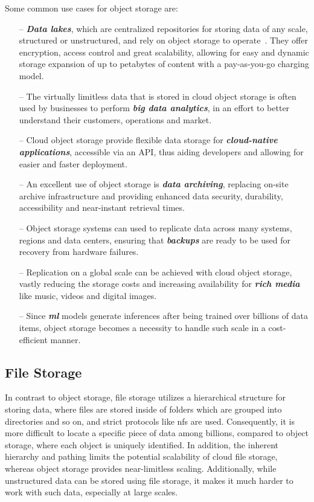 Some common use cases for object storage are:
\begin{itemize}
    \item[--] \textit{\textbf{Data lakes}}, which are centralized repositories for storing data of any scale, structured or unstructured, and rely on object storage to operate~\cite{datalake}. They offer encryption, access control and great scalability, allowing for easy and dynamic storage expansion of up to petabytes of content with a pay-as-you-go charging model.

    \item[--] The virtually limitless data that is stored in cloud object storage is often used by businesses to perform \textit{\textbf{big data analytics}}, in an effort to better understand their customers, operations and market.

    \item [--] Cloud object storage provide flexible data storage for \textit{\textbf{cloud-native applications}}, accessible via an API, thus aiding developers and allowing for easier and faster deployment.

    \item[--] An excellent use of object storage is \textbf{\textit{data archiving}}, replacing on-site archive infrastructure and providing enhanced data security, durability, accessibility and near-instant retrieval times.

    \item [--] Object storage systems can used to replicate data across many systems, regions and data centers, ensuring that \textbf{\textit{backups}} are ready to be used for recovery from hardware failures.

    \item [--] Replication on a global scale can be achieved with cloud object storage, vastly reducing the storage costs and increasing availability for \textit{\textbf{rich media}} like music, videos and digital images.

    \item [--]  Since \textit{\textbf{\ac{ml}}} models generate inferences after being trained over billions of data items, object storage becomes a necessity to handle such scale in a cost-efficient manner.
\end{itemize}

\subsection{File Storage}
In contrast to object storage, file storage utilizes a hierarchical structure for storing data, where files are stored inside of folders which are grouped into directories and so on, and strict protocols like \ac{nfs} are used. Consequently, it is more difficult to locate a specific piece of data among billions, compared to object storage, where each object is uniquely identified. In addition, the inherent hierarchy and pathing limits the potential scalability of cloud file storage, whereas object storage provides near-limitless scaling. Additionally, while unstructured data can be stored using file storage, it makes it much harder to work with such data, especially at large scales.

